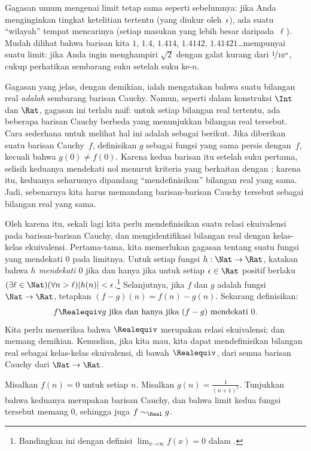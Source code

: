 \documentclass[../../../include/open-logic-section]{subfiles}
\begin{document}
Gagasan umum mengenai limit tetap sama seperti sebelumnya: jika Anda
menginginkan tingkat ketelitian tertentu (yang diukur oleh~$\epsilon$), ada
suatu ``wilayah'' tempat mencarinya (setiap masukan yang lebih besar
daripada~$\ell$). Mudah dilihat bahwa barisan kita $1$, $1.4$, $1.414$,
$1.4142$, $1.41421$\ldots mempunyai suatu limit: jika Anda ingin menghampiri
$\sqrt{2}$ dengan galat kurang dari $\nicefrac{1}{10^{n}}$, cukup perhatikan
sembarang suku setelah suku ke-$n$.

Gagasan yang jelas, dengan demikian, ialah mengatakan bahwa suatu bilangan
real \emph{adalah} sembarang barisan Cauchy. Namun, seperti dalam konstruksi
$\Int$ dan $\Rat$, gagasan ini terlalu naif: untuk setiap bilangan real
tertentu, ada beberapa barisan Cauchy berbeda yang menunjukkan bilangan real
tersebut. Cara sederhana untuk melihat hal ini adalah sebagai berikut. Jika
diberikan suatu barisan Cauchy~$f$, definisikan $g$ sebagai fungsi yang sama
persis dengan~$f$, kecuali bahwa $g(0)\neq f(0)$. Karena kedua barisan itu
setelah suku pertama, selisih keduanya mendekati nol menurut kriteria yang
berkaitan dengan ; karena itu, keduanya seharusnya
dipandang ``mendefinisikan'' bilangan real yang sama. Jadi, sebenarnya kita
harus memandang barisan-barisan Cauchy tersebut sebagai bilangan real yang
sama.

Oleh karena itu, sekali lagi kita perlu mendefinisikan suatu relasi ekuivalensi
pada barisan-barisan Cauchy, dan mengidentifikasi bilangan real dengan
kelas-kelas ekuivalensi. Pertama-tama, kita memerlukan gagasan tentang suatu fungsi yang
mendekati $0$ pada limitnya. Untuk setiap fungsi $h : \Nat \to \Rat$,
katakan bahwa \emph{$h$ mendekati $0$} jika dan hanya jika untuk setiap
$\epsilon \in \Rat$ positif berlaku $(\exists \ell \in \Nat)(\forall n >
\ell)|h(n)| < \epsilon$.\footnote{Bandingkan ini dengan definisi
$\lim_{x \mathord{\rightarrow}\infty}f(x) = 0$ dalam
.} Selanjutnya, jika $f$ dan $g$ adalah fungsi
$\Nat \to \Rat$, tetapkan $(f-g)(n) = f(n) - g(n)$. Sekarang definisikan:
\[
	f \Realequiv g \text{ jika dan hanya jika $(f-g)$ mendekati $0$}.
\]
Kita perlu memeriksa bahwa $\Realequiv$ merupakan relasi ekuivalensi; dan
memang demikian. Kemudian, jika kita mau, kita dapat mendefinisikan bilangan
real sebagai kelas-kelas ekuivalensi, di bawah $\Realequiv$, dari semua
barisan Cauchy dari $\Nat \to \Rat$.

\begin{prob}
Misalkan $f(n) = 0$ untuk setiap $n$. Misalkan $g(n) = \frac{1}{(n+1)^2}$.
Tunjukkan bahwa keduanya merupakan barisan Cauchy, dan bahwa limit kedua
fungsi tersebut memang $0$, sehingga juga $f \sim_\Real g$.
\end{prob}
\end{document}
